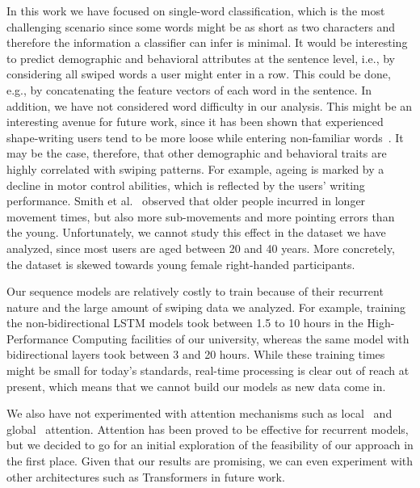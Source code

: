 \documentclass[sn-mathphys, pdflatex]{sn-jnl}
\newcommand{\rev}[1]{#1}
\begin{document}

In this work we have focused on single-word classification,
which is the most challenging scenario since some words might be as short as two characters
and therefore the information a classifier can infer is minimal.
It would be interesting to predict demographic and behavioral attributes
at the sentence level, i.e., by considering all swiped words a user might enter in a row.
This could be done\rev{, e.g.,} by concatenating the feature vectors of each word in the sentence.
\rev{In addition,} we have not considered word difficulty in our analysis.
This might be an interesting avenue for future work,
since it has been shown that experienced shape-writing users
tend to be more loose while entering non-familiar words~\cite{Leiva21_swipe}.
It may be the case, therefore, that other demographic and behavioral traits
are highly correlated with swiping patterns.
For example, ageing is marked by a decline in motor control abilities, which is reflected by the users' writing performance.
Smith et al.~\cite{Smith1999} observed that older people incurred in longer movement times,
but also more sub-movements and more pointing errors than the young.
Unfortunately, we cannot study this effect in the dataset we have analyzed,
since most users are aged between 20 and 40 years.
More concretely, the dataset is skewed towards young female right-handed participants.

Our sequence models are \rev{relatively} costly to train
because of their recurrent nature and the large amount of swiping data we analyzed.
For example, training the non-bidirectional LSTM models took between 1.5 to 10 hours
in the High-Performance Computing facilities of our university,
whereas the same model with bidirectional layers took between 3 and 20 hours.
While these training times might be small for today's standards,
real-time processing is clear out of reach at present,
which means that we cannot build our models as new data come in.
\rev{
We also have not experimented with attention mechanisms such as local~\cite{Bahdanau15} and global~\cite{Luong15} attention.
Attention has been proved to be effective for recurrent models,
but we decided to go for an initial exploration of the feasibility of our approach in the first place.
Given that our results are promising, we can even experiment with other architectures such as Transformers in future work.
}
\end{document}
